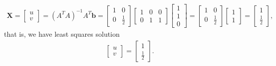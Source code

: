 \documentclass[10pt]{article}
\renewcommand{\vec}{\mathbf}
\begin{document}
\begin{enumerate}
\begin{align*}
        \vec{X} = \begin{bmatrix}
          u \\ v
        \end{bmatrix} = (A^TA)^{-1}A^T \vec{b} = \begin{bmatrix}
          1 & 0 \\ 0 & \frac{1}{2}
        \end{bmatrix}\begin{bmatrix}1 & 0 & 0 \\ 0 & 1 & 1\end{bmatrix}\begin{bmatrix}
          1 \\ 1 \\ 0
        \end{bmatrix} = \begin{bmatrix}
          1 & 0 \\ 0 & \frac{1}{2}
        \end{bmatrix}\begin{bmatrix}1\\1\end{bmatrix} = \begin{bmatrix}
          1 \\ \frac{1}{2}
        \end{bmatrix},
    \end{align*} that is, we have least squares solution \begin{align*}
      \begin{bmatrix}
        u \\ v
      \end{bmatrix} = \begin{bmatrix}
        1 \\ \frac{1}{2}
      \end{bmatrix}.
    \end{align*}


\end{enumerate}
\end{document}
